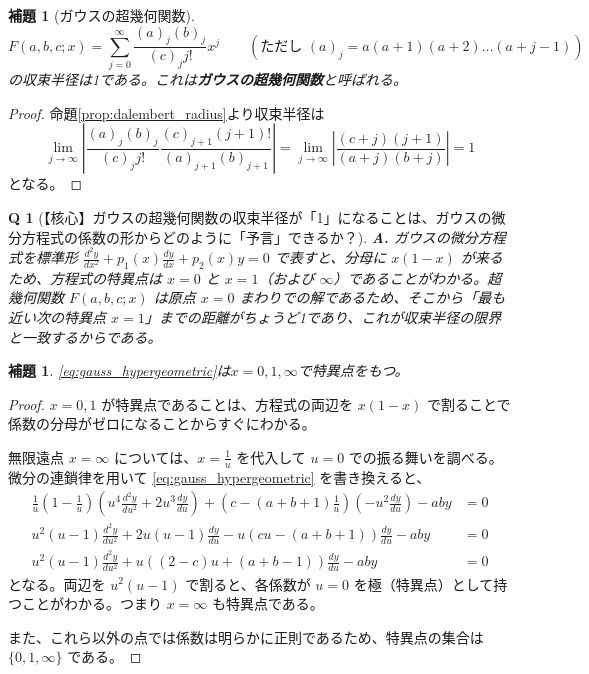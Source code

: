 \documentclass[paper=a4, fontsize=11pt]{jlreq} %
\theoremstyle{break}
\newtheorem{lemma}[theorem]{補題}
\theoremstyle{qa}
\newtheorem*{Q}{Q}
\theoremstyle{remark} %
\begin{document}
\begin{lemma}[ガウスの超幾何関数]\label{lem:hypergeometric}
    \[
        F(a,b,c;x)=\sum_{j=0}^{\infty}\frac{(a)_{j}(b)_{j}}{(c)_{j}j!}x^{j} \qquad \left( \text{ただし } (a)_{j}=a(a+1)(a+2)\dots(a+j-1) \right)
    \]
    の収束半径は1である。これは\textbf{ガウスの超幾何関数}と呼ばれる。
\end{lemma}

\begin{proof}
    命題\ref{prop:dalembert_radius}より収束半径は
    \[
    \lim_{j\to\infty}\left| \frac{(a)_{j}(b)_{j}}{(c)_{j}j!} \frac{(c)_{j+1}(j+1)!}{(a)_{j+1}(b)_{j+1}} \right| = \lim_{j\to\infty}\left| \frac{(c+j)(j+1)}{(a+j)(b+j)} \right| = 1
    \]
    となる。
\end{proof}

\begin{Q}[【核心】ガウスの超幾何関数の収束半径が「1」になることは、ガウスの微分方程式の係数の形からどのように「予言」できるか？]
\textbf{A.} ガウスの微分方程式を標準形 $\frac{d^2y}{dx^2} + p_1(x)\frac{dy}{dx} + p_2(x)y = 0$ で表すと、分母に $x(1-x)$ が来るため、方程式の特異点は $x=0$ と $x=1$（および $\infty$）であることがわかる。超幾何関数 $F(a,b,c;x)$ は原点 $x=0$ まわりでの解であるため、そこから「最も近い次の特異点 $x=1$」までの距離がちょうど1であり、これが収束半径の限界と一致するからである。
\end{Q}
\begin{lemma}
    \eqref{eq:gauss_hypergeometric}は$x=0,1,\infty$で特異点をもつ。
\end{lemma}

\begin{proof}
    $x=0, 1$ が特異点であることは、方程式の両辺を $x(1-x)$ で割ることで係数の分母がゼロになることからすぐにわかる。

    無限遠点 $x=\infty$ については、$x=\frac{1}{u}$ を代入して $u=0$ での振る舞いを調べる。微分の連鎖律を用いて \eqref{eq:gauss_hypergeometric} を書き換えると、
    \begin{align*}
    \frac{1}{u}\left(1-\frac{1}{u}\right)\left(u^{4}\frac{d^{2}y}{du^{2}}+2u^{3}\frac{dy}{du}\right)+\left(c-(a+b+1)\frac{1}{u}\right)\left(-u^{2}\frac{dy}{du}\right)-aby &= 0 \\
    u^{2}(u-1)\frac{d^{2}y}{du^{2}}+2u(u-1)\frac{dy}{du}-u(cu-(a+b+1))\frac{dy}{du}-aby &= 0 \\
    u^{2}(u-1)\frac{d^{2}y}{du^{2}}+u((2-c)u+(a+b-1))\frac{dy}{du}-aby &= 0
    \end{align*}
    となる。両辺を $u^{2}(u-1)$ で割ると、各係数が $u=0$ を極（特異点）として持つことがわかる。つまり $x=\infty$ も特異点である。

    また、これら以外の点では係数は明らかに正則であるため、特異点の集合は $\{0,1,\infty\}$ である。
\end{proof}
\end{document}

